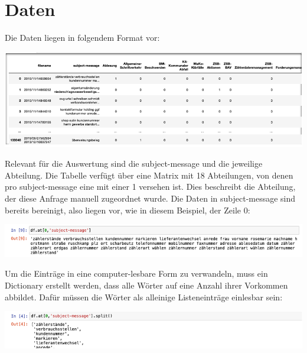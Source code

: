 \documentclass[german,version-2020-11]{uzl-thesis}
\begin{document}
\section{Daten}
Die Daten liegen in folgendem Format vor: 

\begin{center}
\includegraphics{daten1}
\end{center}

Relevant für die Auswertung sind die subject-message und die jeweilige Abteilung. Die Tabelle verfügt über eine Matrix mit 18 Abteilungen, von denen pro subject-message eine mit einer 1 versehen ist. Dies beschreibt die Abteilung, der diese Anfrage manuell zugeordnet wurde. Die Daten in subject-message sind bereits bereinigt, also liegen vor, wie in diesem Beispiel, der Zeile 0:

\begin{center}
\includegraphics{daten2}
\end{center}

Um die Einträge in eine computer-lesbare Form zu verwandeln, muss ein Dictionary erstellt werden, dass alle Wörter auf eine Anzahl ihrer Vorkommen abbildet. Dafür müssen die Wörter als alleinige Listeneinträge einlesbar sein: 

\begin{center}
\includegraphics{daten3}
\end{center}
\end{document}
